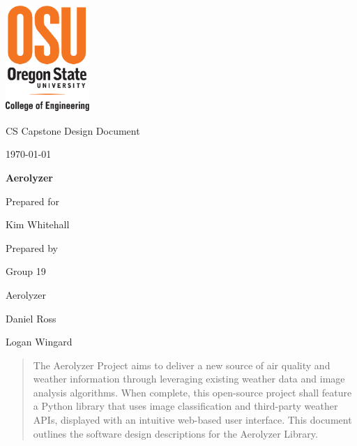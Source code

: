 \documentclass[onecolumn, draftclsnofoot,10pt, compsoc]{IEEEtran}
\def \CapstoneTeamName{		Aerolyzer}
\def \CapstoneTeamNumber{		19}
\def \GroupMemberOne{			Daniel Ross}
\def \GroupMemberTwo{			Logan Wingard}
\def \CapstoneProjectName{		Aerolyzer}
\def \CapstoneSponsorCompany{}
\def \CapstoneSponsorPerson{		Kim Whitehall}
\def \DocType{		%
	Design Document
}
\newcommand{\NameSigPair}[1]{\par
	\makebox[2.75in][r]{#1} \hfil 	\makebox[3.25in]{\makebox[2.25in]{\hrulefill} \hfill		\makebox[.75in]{\hrulefill}}
	\par\vspace{-12pt} \textit{\tiny\noindent
		\makebox[2.75in]{} \hfil		\makebox[3.25in]{\makebox[2.25in][r]{Signature} \hfill	\makebox[.75in][r]{Date}}}}
\renewcommand{\NameSigPair}[1]{#1}
\begin{document}
	\begin{titlepage}
		\begin{singlespace}
			\includegraphics[height=4cm,natwidth=345,natheight=435]{images/coe_v_spot1.png}
			\hfill 
			\par\vspace{.2in}
			\centering
			\scshape{
				\huge CS Capstone \DocType \par
				{\large\today}\par
				\vspace{.5in}
				\textbf{\Huge\CapstoneProjectName}\par
				\vfill
				{\large Prepared for}\par
				{\Huge\NameSigPair{\CapstoneSponsorPerson}\par}
				{\large Prepared by }\par
				Group\CapstoneTeamNumber\par
				\CapstoneTeamName\par 
				\vspace{5pt}
				{\large
					\NameSigPair{\GroupMemberOne}\par
					\NameSigPair{\GroupMemberTwo}\par
				}
				\vspace{20pt}
			}
			\begin{abstract}  
				The Aerolyzer Project aims to deliver a new source of air quality and weather information through leveraging existing weather data and image analysis algorithms.
				When complete, this open-source project shall feature a Python library that uses image classification and third-party weather APIs, displayed with an intuitive web-based user interface.
				This document outlines the software design descriptions for the Aerolyzer Library. 
			\end{abstract}     
		\end{singlespace}
	\end{titlepage}
\end{document}
